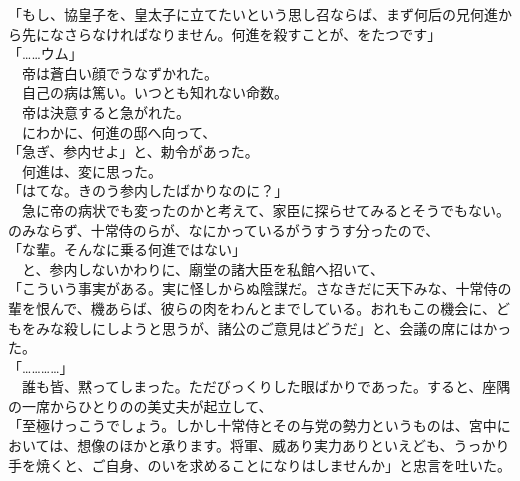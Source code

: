 \documentclass[
  paper=a5,
  fontsize=10pt,
  jafontsize=9.5pt,
  tate,                  %
  open_bracket_pos=nibu, %
]{jlreq}
\begin{document}
「もし、協皇子を、皇太子に立てたいという思し召ならば、まず何后の兄何進から先になさらなければなりません。何進を殺すことが、をたつです」\\


「……ウム」\\


　帝は蒼白い顔でうなずかれた。\\


　自己の病は篤い。いつとも知れない命数。\\


　帝は決意すると急がれた。\\


　にわかに、何進の邸へ向って、\\


「急ぎ、参内せよ」と、勅令があった。\\


　何進は、変に思った。\\


「はてな。きのう参内したばかりなのに？」\\


　急に帝の病状でも変ったのかと考えて、家臣に探らせてみるとそうでもない。のみならず、十常侍のらが、なにかっているがうすうす分ったので、\\


「な輩。そんなに乗る何進ではない」\\


　と、参内しないかわりに、廟堂の諸大臣を私館へ招いて、\\


「こういう事実がある。実に怪しからぬ陰謀だ。さなきだに天下みな、十常侍の輩を恨んで、機あらば、彼らの肉をわんとまでしている。おれもこの機会に、どもをみな殺しにしようと思うが、諸公のご意見はどうだ」と、会議の席にはかった。\\


「…………」\\


　誰も皆、黙ってしまった。ただびっくりした眼ばかりであった。すると、座隅の一席からひとりのの美丈夫が起立して、\\


「至極けっこうでしょう。しかし十常侍とその与党の勢力というものは、宮中においては、想像のほかと承ります。将軍、威あり実力ありといえども、うっかり手を焼くと、ご自身、のいを求めることになりはしませんか」と忠言を吐いた。\\
\end{document}
